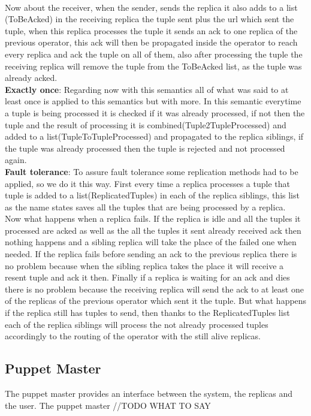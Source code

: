 \documentclass[times, 10pt, twocolumn]{article}
\begin{document}
\\Now about the receiver, when the sender, sends the replica it also adds to a list (ToBeAcked) in the receiving replica the tuple sent plus the url which sent the tuple, when this replica processes the tuple it sends an ack to one replica of the previous operator, this ack will then be propagated inside the operator to reach every replica and ack the tuple on all of them, also after processing the tuple the receiving replica will remove the tuple from the ToBeAcked list, as the tuple was already acked.
\\\textbf{Exactly once}: Regarding now with this semantics all of what was said to at least once is applied to this semantics but with more. In this semantic everytime a tuple is being processed it is checked if it was already processed, if not then the tuple and the result of processing it is combined(Tuple2TupleProcessed) and added to a list(TupleToTupleProcessed) and propagated to the replica siblings, if the tuple was already processed then the tuple is rejected and not processed again.
\\\textbf{Fault tolerance}: To assure fault tolerance some replication methods had to be applied, so we do it this way. First every time a replica processes a tuple that tuple is added to a list(ReplicatedTuples) in each of the replica siblings, this list as the name states saves all the tuples that are being processed by a replica.
\\Now what happens when a replica fails. If the replica is idle and all the tuples it processed are acked as well as the all the tuples it sent already received ack then nothing happens and a sibling replica will take the place of the failed one when needed. If the replica fails before sending an ack to the previous replica there is no problem because when the sibling replica takes the place it will receive a resent tuple and ack it then. Finally if a replica is waiting for an ack and dies there is no problem because the receiving replica will send the ack to at least one of the replicas of the previous operator which sent it the tuple. But what happens if the replica still has tuples to send, then thanks to the ReplicatedTuples list each of the replica siblings will process the not already processed tuples accordingly to the routing of the operator with the still alive replicas.




\subsection{Puppet Master}
The puppet master provides an interface between the system, the replicas and the user.
The puppet master 
//TODO WHAT TO SAY
\end{document}
